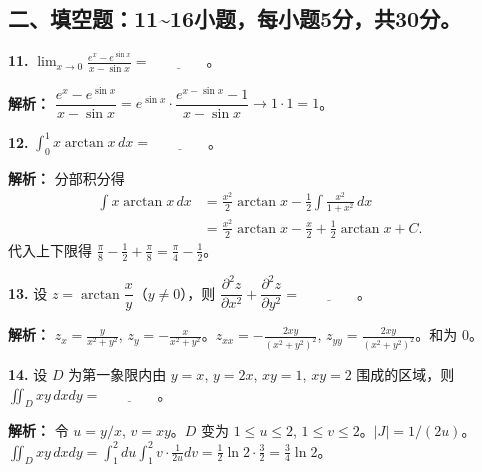 \newpage

\subsection*{二、填空题：11\textasciitilde16小题，每小题5分，共30分。}

\textbf{11.} $\displaystyle\lim_{x \to 0} \frac{e^x - e^{\sin x}}{x - \sin x} = \underline{\qquad\qquad}$。

\ifshowsolutions\par\noindent\textbf{解析：} $\dfrac{e^x-e^{\sin x}}{x-\sin x}=e^{\sin x}\cdot\dfrac{e^{x-\sin x}-1}{x-\sin x}\to 1\cdot1=1$。\else \answerarea \fi

\vspace{8pt}

\textbf{12.} $\displaystyle\int_{0}^{1} x\arctan x\,dx = \underline{\qquad\qquad}$。

\ifshowsolutions\par\noindent\textbf{解析：} 分部积分得
\[
\begin{aligned}
\int x\arctan x\,dx
&=\frac{x^2}{2}\arctan x-\frac{1}{2}\int\frac{x^2}{1+x^2}\,dx\\
&=\frac{x^2}{2}\arctan x-\frac{x}{2}+\frac{1}{2}\arctan x+C.
\end{aligned}
\]
代入上下限得 $\frac{\pi}{8}-\frac{1}{2}+\frac{\pi}{8}=\frac{\pi}{4}-\frac{1}{2}$。
\else \answerarea \fi

\vspace{8pt}

\textbf{13.} 设 $z = \arctan\dfrac{x}{y}$（$y\neq0$），则 $\dfrac{\partial^2 z}{\partial x^2} + \dfrac{\partial^2 z}{\partial y^2} = \underline{\qquad\qquad}$。

\ifshowsolutions\par\noindent\textbf{解析：} $z_x=\frac{y}{x^2+y^2}$, $z_y=-\frac{x}{x^2+y^2}$。$z_{xx}=-\frac{2xy}{(x^2+y^2)^2}$, $z_{yy}=\frac{2xy}{(x^2+y^2)^2}$。和为 $0$。\else \answerarea \fi

\vspace{8pt}

\textbf{14.} 设 $D$ 为第一象限内由 $y=x$, $y=2x$, $xy=1$, $xy=2$ 围成的区域，则 $\displaystyle\iint_{D} xy\,dxdy = \underline{\qquad\qquad}$。

\ifshowsolutions\par\noindent\textbf{解析：} 令 $u=y/x$, $v=xy$。$D$ 变为 $1\leqslant u\leqslant2$, $1\leqslant v\leqslant2$。$|J|=1/(2u)$。$\iint_D xy\,dxdy = \int_1^2 du\int_1^2 v\cdot\frac{1}{2u}dv = \frac{1}{2}\ln2\cdot\frac{3}{2} = \frac{3}{4}\ln2$。
\else \answerarea \fi


